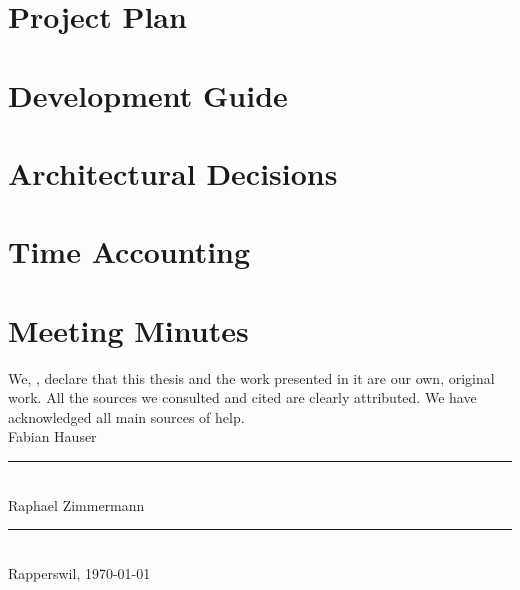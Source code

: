 \section{Project Plan}\label{sec:project-plan}

\section{Development Guide}\label{sec:development-guide}

\section{Architectural Decisions}\label{sec:architectural-decisions}

\section{Time Accounting}\label{sec:time-accounting}

\section{Meeting Minutes}\label{sec:meeting-minutes}







\begin{declaration}
\addchaptertocentry{\authorshipname} %
\noindent We, \authorname, declare that this thesis and the work presented in it are our own, original work.  All the sources we consulted and cited are clearly attributed. We have acknowledged all main sources of help. \\

\noindent Fabian Hauser\\[2em]
\rule[0.5em]{25em}{0.5pt}\\ %
\noindent Raphael Zimmermann\\[2em]
\rule[0.5em]{25em}{0.5pt}\\ %
\noindent Rapperswil, \today
\end{declaration}

\cleardoublepage



  
